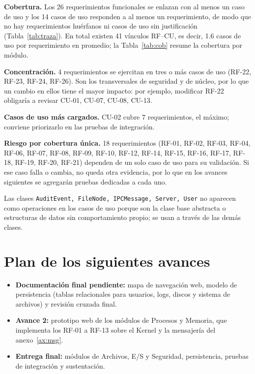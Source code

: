 \documentclass[conference]{IEEEtran}
\begin{document}
\textbf{Cobertura.} Los 26 requerimientos funcionales se enlazan con al menos un caso de uso y los 14 casos de uso responden a al menos un requerimiento, de modo que no hay requerimientos hu\'erfanos ni casos de uso sin justificaci\'on (Tabla~\ref{tab:traza}). En total existen 41 v\'inculos RF--CU, es decir, 1.6 casos de uso por requerimiento en promedio; la Tabla~\ref{tab:cob} resume la cobertura por m\'odulo.

\textbf{Concentraci\'on.} 4 requerimientos se ejercitan en tres o m\'as casos de uso (RF-22, RF-23, RF-24, RF-26). Son los transversales de seguridad y de n\'ucleo, por lo que un cambio en ellos tiene el mayor impacto: por ejemplo, modificar RF-22 obligar\'ia a revisar CU-01, CU-07, CU-08, CU-13.

\textbf{Casos de uso m\'as cargados.} CU-02 cubre 7 requerimientos, el m\'aximo; conviene priorizarlo en las pruebas de integraci\'on.

\textbf{Riesgo por cobertura \'unica.} 18 requerimientos (RF-01, RF-02, RF-03, RF-04, RF-06, RF-07, RF-08, RF-09, RF-10, RF-12, RF-14, RF-15, RF-16, RF-17, RF-18, RF-19, RF-20, RF-21) dependen de un solo caso de uso para su validaci\'on. Si ese caso falla o cambia, no queda otra evidencia, por lo que en los avances siguientes se agregar\'an pruebas dedicadas a cada uno.

Las clases \texttt{AuditEvent, FileNode, IPCMessage, Server, User} no aparecen como operaciones en los casos de uso porque son la clase base abstracta o estructuras de datos sin comportamiento propio; se usan a través de las demás clases.

\section{Plan de los siguientes avances}\label{sec:plan}
\begin{itemize}
\item \textbf{Documentación final pendiente:} mapa de navegación web, modelo de persistencia (tablas relacionales para usuarios, logs, discos y sistema de archivos) y revisión cruzada final.
\item \textbf{Avance 2:} prototipo web de los módulos de Procesos y Memoria, que implementa los RF-01 a RF-13 sobre el Kernel y la mensajería del anexo~\ref{ax:msg}.
\item \textbf{Entrega final:} módulos de Archivos, E/S y Seguridad, persistencia, pruebas de integración y sustentación.
\end{itemize}
\end{document}

